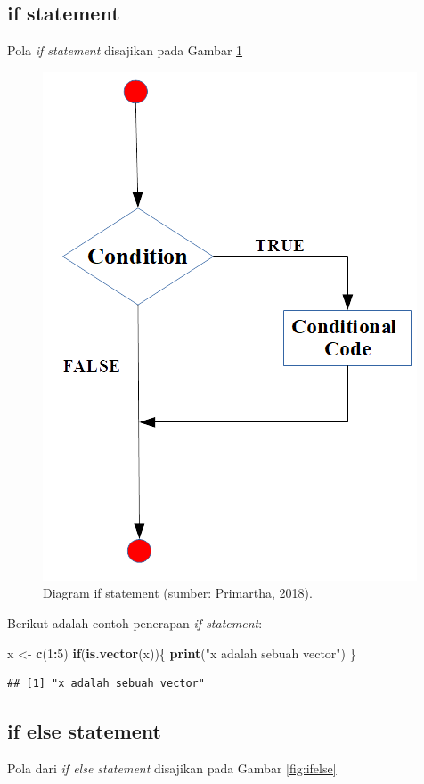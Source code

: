 \documentclass[]{book}
\newenvironment{Shaded}{\begin{snugshade}}{\end{snugshade}}
\newcommand{\KeywordTok}[1]{\textcolor[rgb]{0.13,0.29,0.53}{\textbf{#1}}}
\newcommand{\DecValTok}[1]{\textcolor[rgb]{0.00,0.00,0.81}{#1}}
\newcommand{\StringTok}[1]{\textcolor[rgb]{0.31,0.60,0.02}{#1}}
\newcommand{\ControlFlowTok}[1]{\textcolor[rgb]{0.13,0.29,0.53}{\textbf{#1}}}
\newcommand{\OperatorTok}[1]{\textcolor[rgb]{0.81,0.36,0.00}{\textbf{#1}}}
\newcommand{\NormalTok}[1]{#1}
\begin{document}
\subsection{if statement}\label{if-statement}

Pola \emph{if statement} disajikan pada Gambar \ref{fig:ifstatement}

\begin{figure}

{\centering \includegraphics[width=0.4\linewidth]{ifstatement} 

}

\caption{Diagram if statement (sumber: Primartha, 2018).}\label{fig:ifstatement}
\end{figure}

Berikut adalah contoh penerapan \emph{if statement}:

\begin{Shaded}
\begin{Highlighting}[]
\NormalTok{x <-}\StringTok{ }\KeywordTok{c}\NormalTok{(}\DecValTok{1}\OperatorTok{:}\DecValTok{5}\NormalTok{)}
\ControlFlowTok{if}\NormalTok{(}\KeywordTok{is.vector}\NormalTok{(x))\{}
  \KeywordTok{print}\NormalTok{(}\StringTok{"x adalah sebuah vector"}\NormalTok{)}
\NormalTok{\}}
\end{Highlighting}
\end{Shaded}

\begin{verbatim}
## [1] "x adalah sebuah vector"
\end{verbatim}

\subsection{if else statement}\label{if-else-statement}

Pola dari \emph{if else statement} disajikan pada Gambar
\ref{fig:ifelse}
\end{document}
